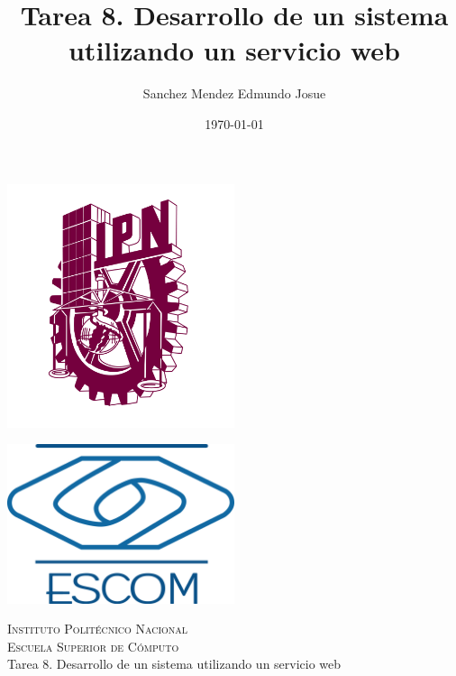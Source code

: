 \documentclass[11pt]{article}
\date{\today}
\title{Tarea 8. Desarrollo de un sistema utilizando un servicio web}
\author{Sanchez Mendez Edmundo Josue}
\begin{document}
		\begin{titlepage}
			\begin{center}
				
				
				\noindent
				\begin{minipage}{0.5\textwidth}
					\begin{flushleft} \large
						\includegraphics[width=0.5\textwidth]{resources/ipn.png}
					\end{flushleft}
				\end{minipage}%
				\begin{minipage}{0.55\textwidth}
					\begin{flushright} \large
						\includegraphics[width=0.5\textwidth]{resources/escom.png}
					\end{flushright}
				\end{minipage}
				
				\textsc{\LARGE Instituto Politécnico Nacional}\\[0.5cm]
				
				\textsc{\Large Escuela Superior de Cómputo}\\[1cm]
				
				
				{ \huge  Tarea 8. Desarrollo de un sistema utilizando un servicio web \\[1cm] }
				

\end{center}
\end{titlepage}
\end{document}
